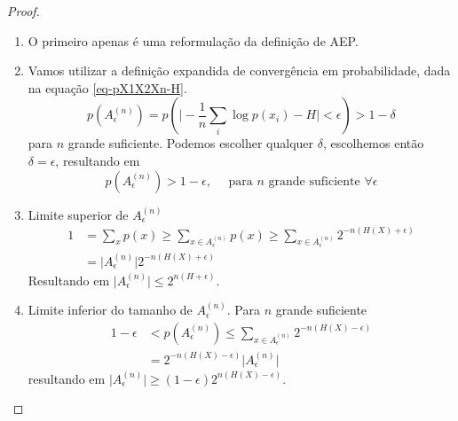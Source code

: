 \begin{proof}
\ \\
\begin{enumerate}
  \item O primeiro apenas é uma reformulação da definição de AEP.
  \item Vamos utilizar a definição expandida de convergência em probabilidade,
          dada na equação \ref{eq-pX1X2Xn-H}.
          \begin{equation}
          p(A_\epsilon^{(n)}) = p\left( \vert - \frac{1}{n} \sum_i \log p(x_i) - H \vert < \epsilon \right) > 1 - \delta
          \end{equation}
          para $n$ grande suficiente.
          Podemos escolher qualquer $\delta$, escolhemos então $\delta = \epsilon$, resultando em
          \begin{equation}
          p(A_\epsilon^{(n)}) > 1 - \epsilon, \quad \text{ para } n \text{ grande suficiente } \forall \epsilon
          \end{equation}
  \item Limite superior de $A_\epsilon^{(n)}$
    \begin{subequations}
      \begin{align}
        1 &= \sum_x p(x) \geq \sum_{x \in A_\epsilon^{(n)}} p(x) \geq \sum_{x \in A_\epsilon^{(n)}} 2^{-n(H(X)+\epsilon)} \\
          &= \vert A_\epsilon^{(n)} \vert 2^{-n(H(X)+\epsilon)}
      \end{align}
    \end{subequations}
  Resultando em $\vert A_\epsilon^{(n)} \vert \leq 2^{n(H+\epsilon)}$.
  \item Limite inferior do tamanho de $A_\epsilon^{(n)}$. Para $n$ grande suficiente
    \begin{subequations}
        \begin{align}
        1 - \epsilon &< p(A_\epsilon^{(n)}) \leq \sum_{x \in A_\epsilon^{(n)}} 2^{-n(H(X)-\epsilon)} \\
                     &= 2^{-n(H(X)-\epsilon)} \vert A_\epsilon^{(n)} \vert
        \end{align}
    \end{subequations}
    resultando em $\vert A_\epsilon^{(n)} \vert \geq (1-\epsilon) 2^{n(H(X)-\epsilon)}$.
\end{enumerate}
\end{proof}

